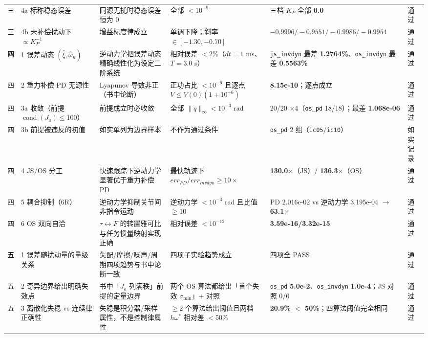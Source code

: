 \documentclass[11pt,a4paper]{ctexart}
\begin{document}
\begin{table}[H]
{\begin{tabular}{@{}p{0.8cm} p{2.9cm} p{3.6cm} p{3.4cm} p{4.0cm} p{1.2cm}@{}}
三 & 4a 标称稳态误差 & 同源无扰时稳态误差恒为 0 & 全部 $<10^{-9}$ & 三档 $K_P$ 全部 \textbf{0.0} & 通过 \\
三 & 4b 未补偿扰动下 $\propto K_P^{-1}$ & 增益标度律成立 & 单调下降；斜率 $\in[-1.30,-0.70]$ & \textbf{$-0.9996/-0.9551/-0.9986/-0.9954$} & 通过 \\
\textbf{四} & 1 误差动态 $(\hat\xi,\hat\omega_n)$ & 逆动力学把误差动态精确线性化为设定二阶系统 & 相对误差 $<2\%$（$dt{=}1$ ms、$T{=}3.0$ s） & \texttt{js\_invdyn} 最差 \textbf{1.2764\%}、\texttt{os\_invdyn} 最差 \textbf{0.5563\%} & 通过 \\
四 & 2 重力补偿 PD 无源性 & Lyapunov 导数非正（书中论断） & 正功占比 $<10^{-6}$ 且逐点 $V\le V(0)(1{+}10^{-6})$ & \textbf{8.15e-10}；逐点成立 & 通过 \\
四 & 3a 收敛（前提 $\operatorname{cond}(J_a)\le100$） & 前提成立时必收敛 & 全部 $\|\tilde q\|_\infty<10^{-3}$ rad & 20/20 $\times$4（\texttt{os\_pd} 18/18）；最差 \textbf{1.068e-06} & 通过 \\
四 & 3b 前提被违反的初值 & 如实单列为边界样本 & 不作为通过条件 & \texttt{os\_pd} 2 组（\texttt{ic05}/\texttt{ic10}） & 如实记录 \\
四 & 4 JS/OS 分工 & 快速跟踪下逆动力学显著优于重力补偿 PD & 最快轨迹下 $err_{PD}/err_{invdyn}\ge10\times$ & \textbf{130.0$\times$}（JS）/ \textbf{136.3$\times$}（OS） & 通过 \\
四 & 5 耦合抑制（6R） & 逆动力学抑制关节间非指令运动 & 逆动力学 $<10^{-3}$ rad 且比值 $\ge10$ & PD 2.016e-02 vs 逆动力学 3.195e-04 $\to$ \textbf{63.1$\times$} & 通过 \\
四 & 6 OS 双向自洽 & $\tau\leftrightarrow F$ 的转置雅可比与任务惯量映射实现正确 & 相对误差 $<10^{-12}$ & \textbf{3.59e-16/3.32e-15} & 通过 \\
\textbf{五} & 1 误差随扰动量的量级关系 & 失配/摩擦/噪声/周期四项趋势与书中论断一致 & 四项子实验趋势成立 & 四项全 PASS & 通过 \\
五 & 2 奇异边界给出明确失效点 & 书中「$J_a$ 列满秩」前提的定量边界 & 两个 OS 算法都给出「首个失效 $\sigma_{\min}$」+ 对照 & \texttt{os\_pd} \textbf{5.0e-2}、\texttt{os\_invdyn} \textbf{1.0e-4}；JS 对照 0/6 & 通过 \\
五 & 3 离散化失稳 vs 连续律正确性 & 失稳是积分器/采样属性，不是控制律属性 & $\ge2$ 个算法给出阈值且两档 $h\omega^*$ 相对差 $<50\%$ & \textbf{20.9\% $<$ 50\%}；四算法阈值完全相同 & 通过 \\
\bottomrule
\end{tabular}%
}
\end{table}
\end{document}
